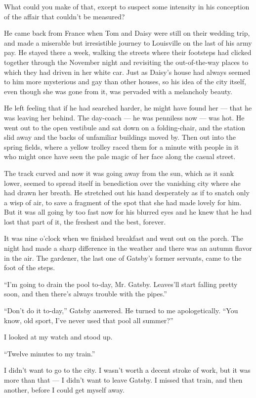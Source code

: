 \documentclass{znotebook}
\begin{document}
What could you make of that, except to suspect some intensity in his conception of the affair that couldn’t be measured?

He came back from France when Tom and Daisy were still on their wedding trip, and made a miserable but irresistible journey to Louisville on the last of his army pay. He stayed there a week, walking the streets where their footsteps had clicked together through the November night and revisiting the out-of-the-way places to which they had driven in her white car. Just as Daisy’s house had always seemed to him more mysterious and gay than other houses, so his idea of the city itself, even though she was gone from it, was pervaded with a melancholy beauty.

He left feeling that if he had searched harder, he might have found her — that he was leaving her behind. The day-coach — he was penniless now — was hot. He went out to the open vestibule and sat down on a folding-chair, and the station slid away and the backs of unfamiliar buildings moved by. Then out into the spring fields, where a yellow trolley raced them for a minute with people in it who might once have seen the pale magic of her face along the casual street.

The track curved and now it was going away from the sun, which as it sank lower, seemed to spread itself in benediction over the vanishing city where she had drawn her breath. He stretched out his hand desperately as if to snatch only a wisp of air, to save a fragment of the spot that she had made lovely for him. But it was all going by too fast now for his blurred eyes and he knew that he had lost that part of it, the freshest and the best, forever.

It was nine o’clock when we finished breakfast and went out on the porch. The night had made a sharp difference in the weather and there was an autumn flavor in the air. The gardener, the last one of Gatsby’s former servants, came to the foot of the steps.

``I’m going to drain the pool to-day, Mr. Gatsby. Leaves’ll start falling pretty soon, and then there’s always trouble with the pipes.''

``Don’t do it to-day,'' Gatsby answered. He turned to me apologetically. ``You know, old sport, I’ve never used that pool all summer?''

I looked at my watch and stood up.

``Twelve minutes to my train.''

I didn’t want to go to the city. I wasn’t worth a decent stroke of work, but it was more than that — I didn’t want to leave Gatsby. I missed that train, and then another, before I could get myself away.
\end{document}
